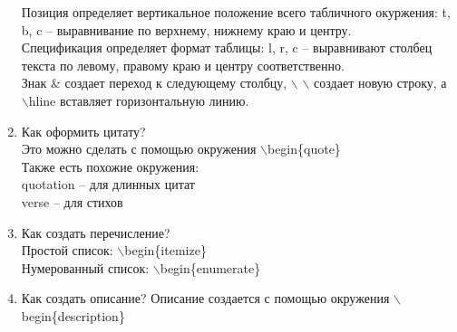 \documentclass[a4paper,12pt]{article} %
\begin{document}
\begin{enumerate}
Позиция определяет вертикальное положение всего табличного окуржения: t, b, c -- выравнивание по верхнему, нижнему краю и центру.\\ Спецификация определяет формат таблицы: l, r, c -- выравнивают столбец текста по левому, правому краю и центру соответственно.\\
Знак \& создает переход к следующему столбцу, $\backslash$ $\backslash$ создает новую строку, а $\backslash$hline вставляет горизонтальную линию.
\item Как оформить цитату?\\
Это можно сделать с помощью окружения $\backslash$begin\{quote\}\\
Также есть похожие окружения:\\
quotation -- для длинных цитат\\
verse -- для стихов
\item Как создать перечисление?\\
Простой список: $\backslash$begin\{itemize\}\\
Нумерованный список: $\backslash$begin\{enumerate\}
\item Как создать описание?
Описание создается с помощью окружения $\backslash$begin\{description\}
\end{enumerate}
\end{document}
